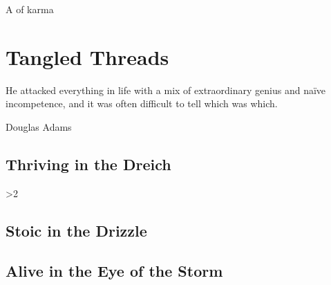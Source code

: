 \documentclass[a4paper,openany]{book}
\begin{document}
%
  {A  of karma}%

\glsunsetall


\printglossary[
  style=topicmcols,
]

\printglossary[
  type=mech,
  style=topicmcols,
  nonumberlist,
  ]

\printglossary[
  type=symbols,
  ]


\mainmatter




\glsresetall
\clearpage


\chapter{Tangled Threads}
  \epigraph{He attacked everything in life with a mix of extraordinary genius and na\"ive incompetence, and it was often difficult to tell which was which.}{Douglas Adams}
\label{threads}

\section{Thriving in the Dreich}
\begin{multicols}{2}
\ifnum\value{cycle}>2
  
  
  
  
\else
  
  
  
  
\fi
\end{multicols}

\section{Stoic in the Drizzle}
\begin{multicols}{2}



\end{multicols}

\section{Alive in the Eye of the Storm}
\end{document}
